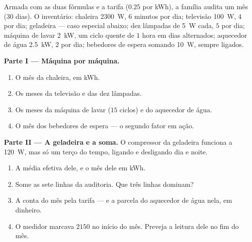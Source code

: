 \begin{problem}\label{pb:g9:electric-power-energy:1}
Armada com as duas fórmulas e a tarifa ($0.25$ por \unit{kWh}), a
família audita um mês (30 dias). O inventário: chaleira
\qty{2300}{W}, $6$ minutos por dia; televisão \qty{100}{W}, $4$ 
por dia; geladeira --- caso especial abaixo; dez lâmpadas de
\qty{5}{W} cada, $5$  por dia; máquina de lavar \qty{2}{kW}, um
ciclo quente de $1$ hora em dias alternados; aquecedor de água
\qty{2.5}{kW}, $2$  por dia; bebedores de espera somando
\qty{10}{W}, sempre ligados.

\medskip\noindent\textbf{Parte I --- Máquina por máquina.}
\begin{enumerate}
  \item O mês da chaleira, em \unit{kWh}.
  \item Os meses da televisão e das dez lâmpadas.
  \item Os meses da máquina de lavar ($15$ ciclos) e do aquecedor de
        água.
  \item O mês dos bebedores de espera --- o segundo fator em ação.
\end{enumerate}

\medskip\noindent\textbf{Parte II --- A geladeira e a soma.}
O compressor da geladeira funciona a \qty{120}{W}, mas só um terço do
tempo, ligando e desligando dia e noite.
\begin{enumerate}[resume]
  \item A  média efetiva dele, e o mês dele em \unit{kWh}.
  \item Some as sete linhas da auditoria. Que três linhas dominam?
  \item A conta do mês pela tarifa --- e a parcela do aquecedor de
        água nela, em dinheiro.
  \item O medidor marcava $2150$  no início do mês. Preveja a
        leitura dele no fim do mês.
\end{enumerate}


\end{problem}
